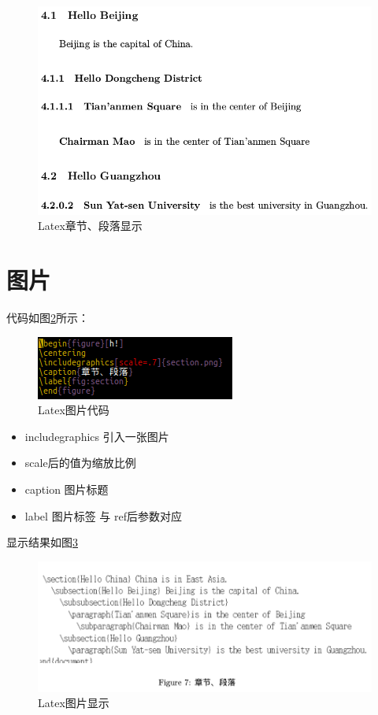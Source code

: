 \documentclass[a4paper,  11pt]{article}
\begin{document}
\begin{figure}[h!]
\centering
\includegraphics[scale=.4]{section_res.png}
\caption{Latex章节、段落显示}
\label{fig:section1}
\end{figure}





\section{图片}

代码如图\ref{fig:picture}所示：

\begin{figure}[h!]
\centering
\includegraphics[scale=.7]{picture.png}
\caption{Latex图片代码}
\label{fig:picture}
\end{figure}

\begin{itemize}
  \item includegraphics 引入一张图片
  \item scale后的值为缩放比例
  \item caption 图片标题
  \item label 图片标签 与 ref后参数对应
\end{itemize}


显示结果如图\ref{fig:picture1}

\begin{figure}[h!]
\centering
\includegraphics[scale=.4]{picture_res.png}
\caption{Latex图片显示}
\label{fig:picture1}
\end{figure}
\end{document}
